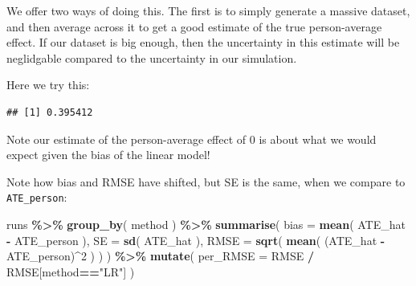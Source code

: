 \documentclass[
]{book}
\newenvironment{Shaded}{\begin{snugshade}}{\end{snugshade}}
\newcommand{\AttributeTok}[1]{\textcolor[rgb]{0.13,0.29,0.53}{#1}}
\newcommand{\DecValTok}[1]{\textcolor[rgb]{0.00,0.00,0.81}{#1}}
\newcommand{\FloatTok}[1]{\textcolor[rgb]{0.00,0.00,0.81}{#1}}
\newcommand{\FunctionTok}[1]{\textcolor[rgb]{0.13,0.29,0.53}{\textbf{#1}}}
\newcommand{\NormalTok}[1]{#1}
\newcommand{\OtherTok}[1]{\textcolor[rgb]{0.56,0.35,0.01}{#1}}
\newcommand{\SpecialCharTok}[1]{\textcolor[rgb]{0.81,0.36,0.00}{\textbf{#1}}}
\newcommand{\StringTok}[1]{\textcolor[rgb]{0.31,0.60,0.02}{#1}}
\begin{document}
We offer two ways of doing this.
The first is to simply generate a massive dataset, and then average across it to get a good estimate of the true person-average effect.
If our dataset is big enough, then the uncertainty in this estimate will be neglidgable compared to the uncertainty in our simulation.

Here we try this:

\begin{Shaded}
\end{Shaded}

\begin{verbatim}
## [1] 0.395412
\end{verbatim}

Note our estimate of the person-average effect of 0 is about what we would expect given the bias of the linear model!

Note how bias and RMSE have shifted, but SE is the same, when we compare to \texttt{ATE\_person}:

\begin{Shaded}
\begin{Highlighting}[]
\NormalTok{runs }\SpecialCharTok{\%\textgreater{}\%} 
  \FunctionTok{group\_by}\NormalTok{( method ) }\SpecialCharTok{\%\textgreater{}\%}
  \FunctionTok{summarise}\NormalTok{( }
    \AttributeTok{bias =} \FunctionTok{mean}\NormalTok{( ATE\_hat }\SpecialCharTok{{-}}\NormalTok{ ATE\_person ),}
    \AttributeTok{SE =} \FunctionTok{sd}\NormalTok{( ATE\_hat ),}
    \AttributeTok{RMSE =} \FunctionTok{sqrt}\NormalTok{( }\FunctionTok{mean}\NormalTok{( (ATE\_hat }\SpecialCharTok{{-}}\NormalTok{ ATE\_person)}\SpecialCharTok{\^{}}\DecValTok{2}\NormalTok{ ) )}
\NormalTok{  ) }\SpecialCharTok{\%\textgreater{}\%}
  \FunctionTok{mutate}\NormalTok{( }\AttributeTok{per\_RMSE =}\NormalTok{ RMSE }\SpecialCharTok{/}\NormalTok{ RMSE[method}\SpecialCharTok{==}\StringTok{"LR"}\NormalTok{] )}
\end{Highlighting}
\end{Shaded}
\end{document}
